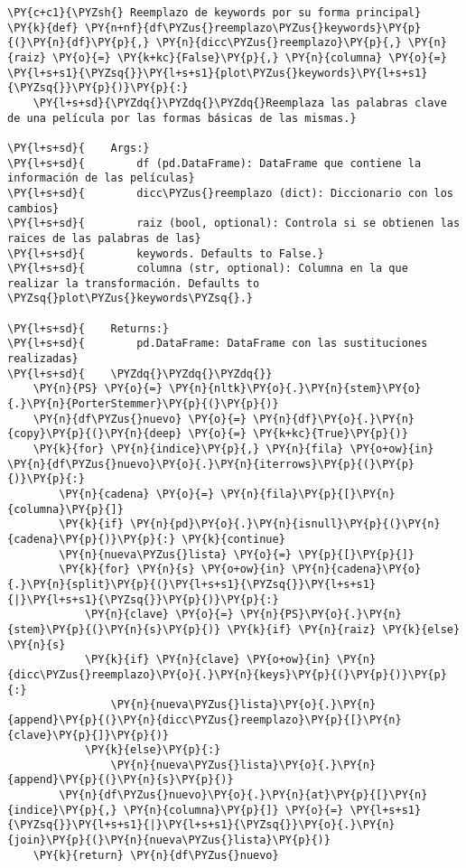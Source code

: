     \begin{tcolorbox}[breakable, size=fbox, boxrule=1pt, pad at break*=1mm,colback=cellbackground, colframe=cellborder]
\begin{Verbatim}[commandchars=\\\{\}]
\PY{c+c1}{\PYZsh{} Reemplazo de keywords por su forma principal}
\PY{k}{def} \PY{n+nf}{df\PYZus{}reemplazo\PYZus{}keywords}\PY{p}{(}\PY{n}{df}\PY{p}{,} \PY{n}{dicc\PYZus{}reemplazo}\PY{p}{,} \PY{n}{raiz} \PY{o}{=} \PY{k+kc}{False}\PY{p}{,} \PY{n}{columna} \PY{o}{=} \PY{l+s+s1}{\PYZsq{}}\PY{l+s+s1}{plot\PYZus{}keywords}\PY{l+s+s1}{\PYZsq{}}\PY{p}{)}\PY{p}{:}
    \PY{l+s+sd}{\PYZdq{}\PYZdq{}\PYZdq{}Reemplaza las palabras clave de una película por las formas básicas de las mismas.}

\PY{l+s+sd}{    Args:}
\PY{l+s+sd}{        df (pd.DataFrame): DataFrame que contiene la información de las películas}
\PY{l+s+sd}{        dicc\PYZus{}reemplazo (dict): Diccionario con los cambios}
\PY{l+s+sd}{        raiz (bool, optional): Controla si se obtienen las raices de las palabras de las}
\PY{l+s+sd}{        keywords. Defaults to False.}
\PY{l+s+sd}{        columna (str, optional): Columna en la que realizar la transformación. Defaults to \PYZsq{}plot\PYZus{}keywords\PYZsq{}.}

\PY{l+s+sd}{    Returns:}
\PY{l+s+sd}{        pd.DataFrame: DataFrame con las sustituciones realizadas}
\PY{l+s+sd}{    \PYZdq{}\PYZdq{}\PYZdq{}}
    \PY{n}{PS} \PY{o}{=} \PY{n}{nltk}\PY{o}{.}\PY{n}{stem}\PY{o}{.}\PY{n}{PorterStemmer}\PY{p}{(}\PY{p}{)}
    \PY{n}{df\PYZus{}nuevo} \PY{o}{=} \PY{n}{df}\PY{o}{.}\PY{n}{copy}\PY{p}{(}\PY{n}{deep} \PY{o}{=} \PY{k+kc}{True}\PY{p}{)}
    \PY{k}{for} \PY{n}{indice}\PY{p}{,} \PY{n}{fila} \PY{o+ow}{in} \PY{n}{df\PYZus{}nuevo}\PY{o}{.}\PY{n}{iterrows}\PY{p}{(}\PY{p}{)}\PY{p}{:}
        \PY{n}{cadena} \PY{o}{=} \PY{n}{fila}\PY{p}{[}\PY{n}{columna}\PY{p}{]}
        \PY{k}{if} \PY{n}{pd}\PY{o}{.}\PY{n}{isnull}\PY{p}{(}\PY{n}{cadena}\PY{p}{)}\PY{p}{:} \PY{k}{continue}
        \PY{n}{nueva\PYZus{}lista} \PY{o}{=} \PY{p}{[}\PY{p}{]}
        \PY{k}{for} \PY{n}{s} \PY{o+ow}{in} \PY{n}{cadena}\PY{o}{.}\PY{n}{split}\PY{p}{(}\PY{l+s+s1}{\PYZsq{}}\PY{l+s+s1}{|}\PY{l+s+s1}{\PYZsq{}}\PY{p}{)}\PY{p}{:} 
            \PY{n}{clave} \PY{o}{=} \PY{n}{PS}\PY{o}{.}\PY{n}{stem}\PY{p}{(}\PY{n}{s}\PY{p}{)} \PY{k}{if} \PY{n}{raiz} \PY{k}{else} \PY{n}{s}
            \PY{k}{if} \PY{n}{clave} \PY{o+ow}{in} \PY{n}{dicc\PYZus{}reemplazo}\PY{o}{.}\PY{n}{keys}\PY{p}{(}\PY{p}{)}\PY{p}{:}
                \PY{n}{nueva\PYZus{}lista}\PY{o}{.}\PY{n}{append}\PY{p}{(}\PY{n}{dicc\PYZus{}reemplazo}\PY{p}{[}\PY{n}{clave}\PY{p}{]}\PY{p}{)}
            \PY{k}{else}\PY{p}{:}
                \PY{n}{nueva\PYZus{}lista}\PY{o}{.}\PY{n}{append}\PY{p}{(}\PY{n}{s}\PY{p}{)}       
        \PY{n}{df\PYZus{}nuevo}\PY{o}{.}\PY{n}{at}\PY{p}{[}\PY{n}{indice}\PY{p}{,} \PY{n}{columna}\PY{p}{]} \PY{o}{=} \PY{l+s+s1}{\PYZsq{}}\PY{l+s+s1}{|}\PY{l+s+s1}{\PYZsq{}}\PY{o}{.}\PY{n}{join}\PY{p}{(}\PY{n}{nueva\PYZus{}lista}\PY{p}{)}
    \PY{k}{return} \PY{n}{df\PYZus{}nuevo}
\end{Verbatim}
\end{tcolorbox}

